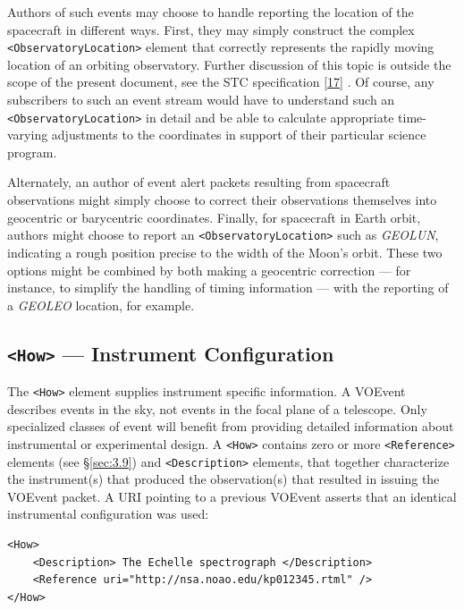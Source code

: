 \documentclass[11pt,a4paper]{ivoa}
\begin{document}
Authors of such events may choose to handle reporting the location of the spacecraft in different ways. First, they may simply construct the complex {\tt <ObservatoryLocation>} element that correctly represents the rapidly moving location of an orbiting observatory. Further discussion of this topic is outside the scope of the present document, see the STC specification [\hyperref[bib17]{17}]
. Of course, any subscribers to such an event stream would have to understand such an {\tt <ObservatoryLocation>} in detail and be able to calculate appropriate time-varying adjustments to the coordinates in support of their particular science program. 

Alternately, an author of event alert packets resulting from spacecraft observations might simply choose to correct their observations themselves into geocentric or barycentric coordinates. Finally, for spacecraft in Earth orbit, authors might choose to report an {\tt <ObservatoryLocation>} such as \emph{GEOLUN}, indicating a rough position precise to the width of the Moon's orbit. These two options might be combined by both making a geocentric correction --- for instance, to simplify the handling of timing information --- with the reporting of a \emph{GEOLEO} location, for example. 

\subsection{{\tt <How>} --- Instrument Configuration}
\label{sec:3.5}
The {\tt <How>} element supplies instrument specific information. A VOEvent describes events in the sky, not events in the focal plane of a telescope. Only specialized classes of event will benefit from providing detailed information about instrumental or experimental design. A {\tt <How>} contains zero or more {\tt <Reference>} elements (see \S\ref{sec:3.9}) and {\tt <Description>} elements, that together characterize the instrument(s) that produced the observation(s) that resulted in issuing the VOEvent packet. A URI pointing to a previous VOEvent asserts that an identical instrumental configuration was used: 
{\footnotesize
\begin{verbatim}
<How>
    <Description> The Echelle spectrograph </Description>
    <Reference uri="http://nsa.noao.edu/kp012345.rtml" />
</How> 
\end{verbatim}}
\end{document}
